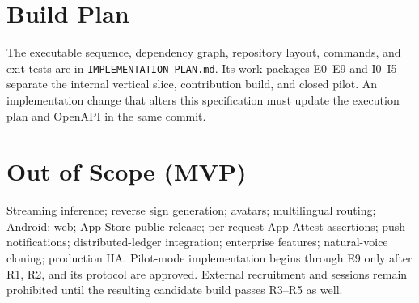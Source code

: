 \documentclass[11pt]{article}
\newcommand{\code}[1]{\texttt{#1}}
\begin{document}
\section{Build Plan}

The executable sequence, dependency graph, repository layout, commands, and exit tests
are in \code{IMPLEMENTATION\_PLAN.md}. Its work packages E0--E9 and I0--I5 separate
the internal vertical slice, contribution build, and closed pilot. An implementation
change that alters this specification must update the execution plan and OpenAPI in
the same commit.

\section{Out of Scope (MVP)}

Streaming inference; reverse sign generation; avatars; multilingual routing;
Android; web; App Store public release; per-request App Attest assertions; push
notifications; distributed-ledger integration; enterprise features; natural-voice
cloning; production HA. Pilot-mode implementation begins through E9 only after R1,
R2, and its protocol are approved. External recruitment and sessions remain prohibited
until the resulting candidate build passes R3--R5 as well.
\end{document}
